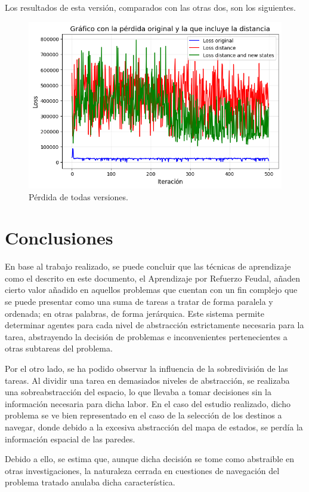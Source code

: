 \documentclass[letterpaper]{article} %
\begin{document}
Los resultados de esta versión, comparados con las otras dos, son los siguientes.
\begin{figure}[H]
    \centering
    \includegraphics[width=0.9\columnwidth]{FuN_3.png}
    \caption{Pérdida de todas versiones.\label{fig:FuN5}}
\end{figure}


\section{Conclusiones}
En base al trabajo realizado, se puede concluir que las técnicas de aprendizaje como el descrito en este documento, el Aprendizaje por Refuerzo Feudal, añaden cierto valor añadido en aquellos problemas que cuentan con un fin complejo que se puede presentar como una suma de tareas a tratar de forma paralela y ordenada; en otras palabras, de forma jerárquica. Este sistema permite determinar agentes para cada nivel de abstracción estrictamente necesaria para la tarea, abstrayendo la decisión de problemas e inconvenientes pertenecientes a otras subtareas del problema.


Por el otro lado, se ha podido observar la influencia de la sobredivisión de las tareas. Al dividir una tarea en demasiados niveles de abstracción, se realizaba una sobreabstracción del espacio, lo que llevaba a tomar decisiones sin la información necesaria para dicha labor. En el caso del estudio realizado, dicho problema se ve bien representado en el caso de la selección de los destinos a navegar, donde debido a la excesiva abstracción del mapa de estados, se perdía la información espacial de las paredes. 


Debido a ello, se estima que, aunque dicha decisión se tome como abstraible en otras investigaciones, la naturaleza cerrada en cuestiones de navegación del problema tratado anulaba dicha característica.




\end{document}
